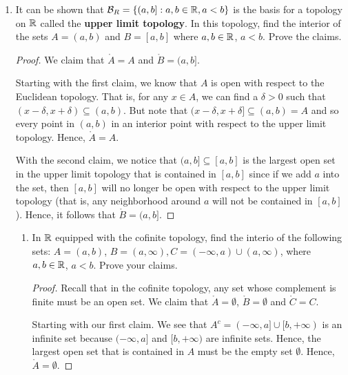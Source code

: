 \documentclass[a4paper]{article}
\begin{document}
\begin{problem}
  \begin{enumerate}
      \item[(i)] It can be shown that \( {\mathcal{B}}_{R} = \{ (a,b] : a,b \in \mathbb{R} , a < b \}  \) is the basis for a topology on \( \mathbb{R}  \) called the \textbf{upper limit topology}. In this topology, find the interior of the sets \( A = (a,b)  \) and \( B = [a,b] \) where \( a,b \in \mathbb{R}  \), \( a < b  \). Prove the claims.
          \begin{proof}
              We claim that \( \mathring{A} = A  \) and \( \mathring{B} = (a,b] \). 

              Starting with the first claim, we know that \(  A \) is open with respect to the Euclidean topology. That is, for any \( x \in A  \), we can find a \( \delta > 0  \) such that \( (x- \delta, x + \delta) \subseteq (a,b) \). But note that \( (x - \delta, x + \delta] \subseteq (a,b) = A   \) and so every point in \( (a,b) \) in an interior point with respect to the upper limit topology. Hence, \( \mathring{A} = A  \).

              With the second claim, we notice that \( (a,b] \subseteq [a,b]  \) is the largest open set in the upper limit topology that is contained in \( [a,b] \) since if we add \(  a \) into the set, then \( [a,b] \) will no longer be open with respect to the upper limit topology (that is, any neighborhood around \( a  \) will not be contained in \( [a,b] \)). Hence, it follows that \( \mathring{B} =  (a,b] \).
          \end{proof}
          \begin{enumerate}
              \item[(ii)] In \( \mathbb{R}  \) equipped with the cofinite topology, find the interio of the following sets: \( A = (a,b) \), \( B = (a,\infty ),  C = (-\infty , a) \cup (a,\infty )  \), where \( a,b \in \mathbb{R}  \), \( a < b  \). Prove your claims.
                  \begin{proof}
                      Recall that in the cofinite topology, any set whose complement is finite must be an open set. We claim that \( \mathring{A} = \emptyset  \), \( \mathring{B} = \emptyset \) and \( \mathring{C} = C  \).  

                      Starting with our first claim. We see that \( A^{c} = (-\infty , a] \cup [b,+\infty)    \) is an infinite set because \( (-\infty , a]  \) and \( [b,+\infty) \) are infinite sets. Hence, the largest open set that is contained in \( A  \) must be the empty set \( \emptyset \). Hence, \( \mathring{A} = \emptyset \).


\end{proof}
\end{enumerate}
\end{enumerate}
\end{problem}
\end{document}

